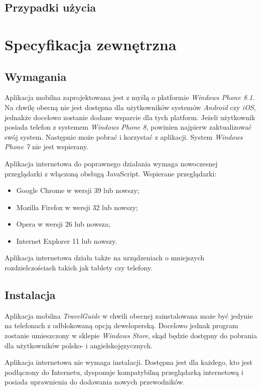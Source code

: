 \documentclass{book}
\newcommand{\appName}{\emph{TravelGuide} }
\begin{document}
		\section{Przypadki użycia}
		
		
	\chapter{Specyfikacja zewnętrzna}
		\section{Wymagania}
		
		Aplikacja mobilna zaprojektowana jest z myślą o platformie \emph{Windows Phone 8.1}. Na chwilę obecną nie jest dostępna dla użytkowników systemów \emph{Android} czy \emph{iOS}, jednakże docelowo zostanie dodane wsparcie dla tych platform. Jeżeli użytkownik posiada telefon z systemem \emph{Windows Phone 8}, powinien najpierw zaktualizować swój system. Następnie może pobrać i korzystać z aplikacji. System \emph{Windows Phone 7} nie jest wspierany.
		
		Aplikacja internetowa do poprawnego działania wymaga nowoczesnej przeglądarki z włączoną obsługą JavaScript. Wspierane przeglądarki:
		\begin{itemize}
			\item Google Chrome w wersji 39 lub nowszy;
			\item Mozilla Firefox w wersji 32 lub nowszy;
			\item Opera w wersji 26 lub nowsza;
			\item Internet Explorer 11 lub nowszy.
		\end{itemize}
		
		Aplikacja internetowa działa także na urządzeniach o mniejszych rozdzielczościach takich jak tablety czy telefony.
		
		\section{Instalacja}
		
		Aplikacja mobilna \appName w chwili obecnej zainstalowana może być jedynie na telefonach z odblokowaną opcją deweloperską. Docelowo jednak program zostanie umieszczony w sklepie \emph{Windows Store}, skąd będzie dostępny do pobrania dla użytkowników polsko- i angielskojęzycznych. 
		
		Aplikacja internetowa nie wymaga instalacji. Dostępna jest dla każdego, kto jest podłączony do Internetu, dysponuje kompatybilną przeglądarką internetową i posiada uprawnienia do dodawania nowych przewodników. 
	
\end{document}
